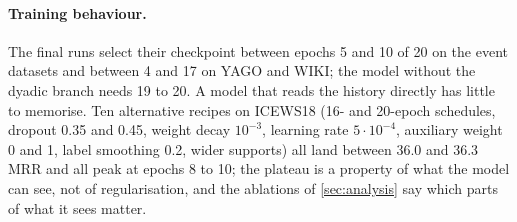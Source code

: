 \paragraph{Training behaviour.}
The final runs select their checkpoint between epochs 5 and 10 of 20 on the event datasets and between 4 and 17 on YAGO and WIKI; the model without the dyadic branch needs 19 to 20. A model that reads the history directly has little to memorise. Ten alternative recipes on ICEWS18 (16- and 20-epoch schedules, dropout 0.35 and 0.45, weight decay $10^{-3}$, learning rate $5 \cdot 10^{-4}$, auxiliary weight 0 and 1, label smoothing 0.2, wider supports) all land between 36.0 and 36.3 MRR and all peak at epochs 8 to 10; the plateau is a property of what the model can see, not of regularisation, and the ablations of \cref{sec:analysis} say which parts of what it sees matter.
